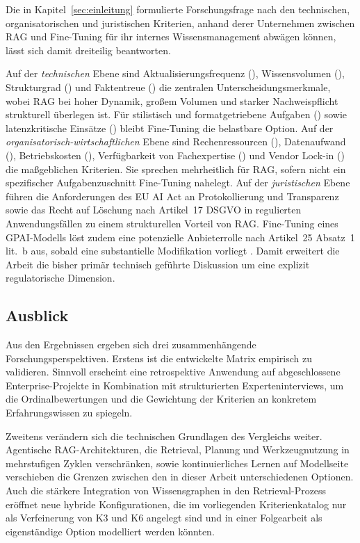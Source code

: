 Die in Kapitel~\ref{sec:einleitung} formulierte Forschungsfrage nach den technischen, organisatorischen und juristischen Kriterien, anhand derer Unternehmen zwischen RAG und Fine-Tuning für ihr internes Wissensmanagement abwägen können, lässt sich damit dreiteilig beantworten.

Auf der \textit{technischen} Ebene sind Aktualisierungsfrequenz (), Wissensvolumen (), Strukturgrad () und Faktentreue () die zentralen Unterscheidungsmerkmale, wobei RAG bei hoher Dynamik, großem Volumen und starker Nachweispflicht strukturell überlegen ist. Für stilistisch und formatgetriebene Aufgaben () sowie latenzkritische Einsätze () bleibt Fine-Tuning die belastbare Option. Auf der \textit{organisatorisch-wirtschaftlichen} Ebene sind Rechenressourcen (), Datenaufwand (), Betriebskosten (), Verfügbarkeit von Fachexpertise () und Vendor Lock-in () die maßgeblichen Kriterien. Sie sprechen mehrheitlich für RAG, sofern nicht ein spezifischer Aufgabenzuschnitt Fine-Tuning nahelegt. Auf der \textit{juristischen} Ebene führen die Anforderungen des EU AI Act an Protokollierung und Transparenz \autocite[Art.~12, Art.~13]{EuropaischesParlamentundRat.2024} sowie das Recht auf Löschung nach Artikel~17 DSGVO \autocite[Art.~17]{EuropaischesParlamentundRat.2016} in regulierten Anwendungsfällen zu einem strukturellen Vorteil von RAG. Fine-Tuning eines GPAI-Modells löst zudem eine potenzielle Anbieterrolle nach Artikel~25 Absatz~1 lit.~b aus, sobald eine substantielle Modifikation vorliegt \autocite[Rn.~61]{EuropeanCommission.2025}. Damit erweitert die Arbeit die bisher primär technisch geführte Diskussion um eine explizit regulatorische Dimension.

\subsection{Ausblick}

Aus den Ergebnissen ergeben sich drei zusammenhängende Forschungsperspektiven. Erstens ist die entwickelte Matrix empirisch zu validieren. Sinnvoll erscheint eine retrospektive Anwendung auf abgeschlossene Enterprise-Projekte in Kombination mit strukturierten Experteninterviews, um die Ordinalbewertungen und die Gewichtung der Kriterien an konkretem Erfahrungswissen zu spiegeln.

Zweitens verändern sich die technischen Grundlagen des Vergleichs weiter. Agentische RAG-Architekturen, die Retrieval, Planung und Werkzeugnutzung in mehrstufigen Zyklen verschränken, sowie kontinuierliches Lernen auf Modellseite verschieben die Grenzen zwischen den in dieser Arbeit unterschiedenen Optionen. Auch die stärkere Integration von Wissensgraphen in den Retrieval-Prozess \autocite[17]{Karakurt.2026} eröffnet neue hybride Konfigurationen, die im vorliegenden Kriterienkatalog nur als Verfeinerung von K3 und K6 angelegt sind und in einer Folgearbeit als eigenständige Option modelliert werden könnten.

